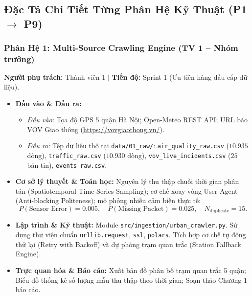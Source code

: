 \documentclass[11pt,a4paper]{article}
\begin{document}
\subsection{Đặc Tả Chi Tiết Từng Phân Hệ Kỹ Thuật (P1 $\to$ P9)}

\subsubsection{Phân Hệ 1: Multi-Source Crawling Engine (TV 1 -- Nhóm trưởng)}
\textbf{Người phụ trách:} Thành viên 1 \quad $\vert$ \quad \textbf{Tiến độ:} Sprint 1 (Ưu tiên hàng đầu cấp dữ liệu).
\begin{itemize}[leftmargin=*]
    \item \textbf{Đầu vào \& Đầu ra:}
    \begin{itemize}
        \item \textit{Đầu vào:} Tọa độ GPS 5 quận Hà Nội; Open-Meteo REST API; URL báo VOV Giao thông (\url{https://vovgiaothong.vn/}).
        \item \textit{Đầu ra:} Tệp dữ liệu thô tại \texttt{data/01\_raw/}: \texttt{air\_quality\_raw.csv} ($10.935$ dòng), \texttt{traffic\_raw.csv} ($10.930$ dòng), \texttt{vov\_live\_incidents.csv} ($25$ bản tin), \texttt{events\_raw.csv}.
    \end{itemize}
    \item \textbf{Cơ sở lý thuyết \& Toán học:}
    Nguyên lý thu thập chuỗi thời gian phân tán (Spatiotemporal Time-Series Sampling); cơ chế xoay vòng User-Agent (Anti-blocking Politeness); mô phỏng nhiễu cảm biến thực tế:
    \begin{equation}
        P(\text{Sensor Error}) = 0.005, \quad P(\text{Missing Packet}) = 0.025, \quad N_{\text{duplicate}} = 15.
    \end{equation}
    \item \textbf{Lập trình \& Kỹ thuật:} Module \texttt{src/ingestion/urban\_crawler.py}. Sử dụng thư viện chuẩn \texttt{urllib.request}, \texttt{ssl}, \texttt{polars}. Tích hợp cơ chế tự động thử lại (Retry with Backoff) và dự phòng trạm quan trắc (Station Fallback Engine).
    \item \textbf{Trực quan hóa \& Báo cáo:} Xuất bản đồ phân bố trạm quan trắc 5 quận; Biểu đồ thống kê số lượng mẫu thu thập theo thời gian; Soạn thảo Chương 1 báo cáo.
\end{itemize}
\end{document}
